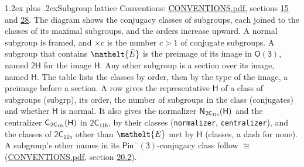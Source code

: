 \documentclass[10pt,a4paper]{article}
\makeatletter
\renewcommand\section{\@startsection{section}{1}{\z@}{-3ex plus -1ex minus -.2ex}%
  {1.2ex plus .2ex}{\normalfont\large\sffamily\bfseries\color{parttitle}}}
\numberwithin{equation}{section}
\newcommand{\eltfont}[1]{{\let\sigma\eltsigma\mathelt{#1}}}
\newcommand{\grp}[1]{\mathsf{#1}}
\newcommand{\cls}[1]{\eltfont{#1}}
\newcommand{\elt}[1]{\eltfont{#1}}
\newcommand{\samecls}{\cong}
\newcommand{\barred}[1]{\bar{#1}}
\newcommand{\hairsp}{\mkern1mu}
\makeatother
\begin{document}
\section{Subgroup lattice}\label{s:subgroups}
Conventions: \href{../../CONVENTIONS.pdf}{CONVENTIONS.pdf}, sections \href{../../../rotation/CONVENTIONS.pdf\#conv.15}{15} and \href{../../CONVENTIONS.pdf\#conv.28}{28}.
The diagram shows the conjugacy classes of subgroups, each joined to the classes of its maximal subgroups, and the orders increase upward. \label{n:index.conjugates.c}A normal subgroup is framed, and ${\times}c$ is the number $c > 1$ of conjugate subgroups. \label{n:group.H}A subgroup that contains $\elt{\barred{E}}$ is the preimage of its image in $\grp{O(3)}$, named $\grp{2H}$ for the image $\grp{H}$. Any other subgroup is a section over its image, named $\grp{H}$. The table lists the classes by order, then by the type of the image, a preimage before a section. \label{n:head.subgroup}\label{n:head.order}\label{n:head.conjugates}\label{n:head.normal}A row gives the representative $\grp{H}$ of a class of subgroups (subgrp), its order, the number of subgroups in the class (conjugates) and whether $\grp{H}$ is normal. \label{n:group.normalizer}\label{n:group.centralizer}\label{n:head.classes}It also gives the normalizer $\grp{N}_{\hairsp \grp{2C_{11h}}}(\grp{H})$ and the centralizer $\grp{C}_{\hairsp \grp{2C_{11h}}}(\grp{H})$ in $\grp{2C_{11h}}$, by their classes (\texttt{normalizer}, \texttt{centralizer}), and the classes of $\grp{2C_{11h}}$ other than $\cls{E}$ met by $\grp{H}$ (classes, a dash for none). A subgroup's other names in its \href{Pinminus3.pdf}{$\grp{Pin^{-}(3)}$}-conjugacy class follow $\samecls$ (\href{../../CONVENTIONS.pdf}{CONVENTIONS.pdf}, section \href{../../CONVENTIONS.pdf\#conv.20.2}{20.2}).
\begin{center}
\end{center}
\end{document}
